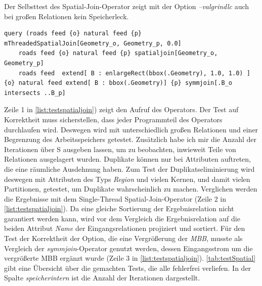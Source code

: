 \documentclass[a4paper,12pt,twoside]{article}
\newcommand{\Fb}[1]{\textit{#1}} %
\begin{document}
Der Selbsttest des Spatial-Join-Operator zeigt mit der Option \Fb{--valgrindlc} auch bei großen Relationen kein Speicherleck.

\begin{minipage}{\linewidth}
	\begin{lstlisting}[caption={Beispiel Testqueries für den Spatial-Join-Operator ohne \Fb{project} und \Fb{sortby}}, label=list:testspatialjoin]
	query (roads feed {o} natural feed {p} mThreadedSpatialJoin[Geometry_o, Geometry_p, 0.0]
	roads feed {o} natural feed {p} spatialjoin[Geometry_o, Geometry_p]
	roads feed  extend[ B : enlargeRect(bbox(.Geometry), 1.0, 1.0) ] {o} natural feed extend[ B : bbox(.Geometry)] {p} symmjoin[.B_o intersects ..B_p]
	\end{lstlisting}
\end{minipage}

Zeile 1 in \autoref{list:testspatialjoin}) zeigt den Aufruf des Operators. Der Test auf Korrektheit muss sicherstellen, dass jeder Programmteil des Operators durchlaufen wird. Deswegen wird mit unterschiedlich großen Relationen und einer Begrenzung des Arbeitsspeichers getestet. Zusätzlich habe ich mir die Anzahl der Iterationen über S ausgeben lassen, um zu beobachten, inwieweit Teile von Relationen ausgelagert wurden. Duplikate können nur bei Attributen auftreten, die eine räumliche Ausdehnung haben. Zum Test der Duplikatseliminierung wird deswegen mit Attributen des Typs \Fb{Region} und vielen Kernen, und damit vielen Partitionen, getestet, um Duplikate wahrscheinlich zu machen. Verglichen werden die Ergebnisse mit dem Single-Thread Spatial-Join-Operator (Zeile 2 in \autoref{list:testspatialjoin}). Da eine gleiche Sortierung der Ergebnisrelation nicht garantiert werden kann, wird vor dem Vergleich die Ergebnisrelation auf die beiden Attribut \Fb{Name} der Eingangsrelationen projiziert und sortiert. Für den Test der Korrektheit der Option, die eine Vergrößerung der \Fb{MBB}, musste als Vergleich der \Fb{symmjoin}-Operator genutzt werden, dessen Eingangsstrom um die vergrößerte MBB ergänzt wurde (Zeile 3 in \autoref{list:testspatialjoin}). \autoref{tab:testSpatial} gibt eine Übersicht über die gemachten Tests, die alle fehlerfrei verliefen. In der Spalte \Fb{speicherintern} ist die Anzahl der Iterationen dargestellt. 
\end{document}
